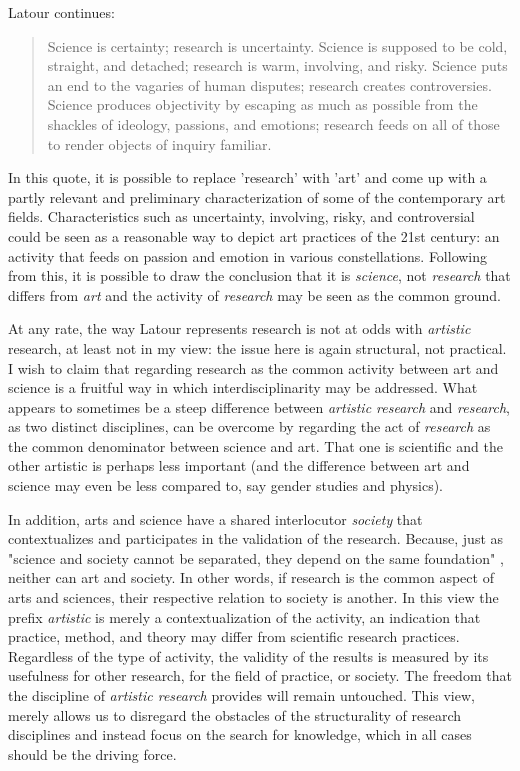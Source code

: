 \documentclass[11pt]{article}
\begin{document}
Latour continues:
\begin{quote}
Science is certainty; research is uncertainty. Science is supposed to be cold, straight, and detached; research is warm, involving, and risky. Science puts an end to the vagaries of human disputes; research creates controversies.  Science produces objectivity by escaping as much as possible from the shackles of ideology, passions, and emotions; research feeds on all of those to render objects of inquiry familiar. \citep{Latour1998}
\end{quote}

In this quote, it is possible to replace 'research' with 'art' and
come up with a partly relevant and preliminary characterization of
some of the contemporary art fields. Characteristics such as
uncertainty, involving, risky, and controversial could be seen as a
reasonable way to depict art practices of the 21st century: an
activity that feeds on passion and emotion in various
constellations. Following from this, it is possible to draw the
conclusion that it is \emph{science}, not
\emph{research} that differs from \emph{art} and the activity of
\emph{research} may be seen as the common ground.

At any rate, the way Latour represents research is not at odds with
\emph{artistic} research, at least not in my view: the issue here is
again structural, not practical. I wish to claim that regarding
research as the common activity between art and science is a fruitful
way in which interdisciplinarity may be addressed. What appears to
sometimes be a steep difference between \emph{artistic research} and
\emph{research}, as two distinct disciplines, can be overcome by
regarding the act of \emph{research} as the common denominator between
science and art. That one is scientific and the other artistic is
perhaps less important (and the difference between art and science may
even be less compared to, say gender studies and physics).

In addition, arts and science have a shared interlocutor
\emph{society} that contextualizes and participates in the validation
of the research. Because, just as "science and society cannot be
separated, they depend on the same foundation" \citep{Latour1998},
neither can art and society. In other words, if research is the common
aspect of arts and sciences, their respective relation to society is
another. In this view the prefix \emph{artistic} is merely a
contextualization of the activity, an indication that practice, method,
and theory may differ from scientific research practices. Regardless
of the type of activity, the validity of the results is measured by
its usefulness for other research, for the field of practice, or
society. The freedom that the discipline of \emph{artistic
    research} provides will remain untouched. This view, merely allows
us to disregard the obstacles of the structurality of research
disciplines and instead focus on the search for knowledge, which in
all cases should be the driving force.

\label{sec:org4513767}
\printbibliography
\end{document}
